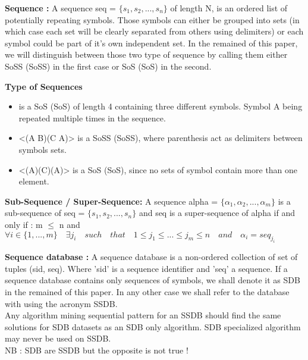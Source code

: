 \documentclass{eplmastersthesis}
\begin{document}
\begin{definition}{\bfseries Sequence :}
A sequence seq = $\{s_1, s_2, ..., s_n\}$ of length N, is an ordered list of potentially repeating symbols. Those symbols can either be grouped into sets (in which case each set will be clearly separated from others using delimiters) or each symbol could be part of it's own independent set. In the remained of this paper, we will distinguish between those two type of sequence by calling them either \acrlong{SoSS} (\acrshort{SoSS}) in the first case or \acrlong{SoS} (\acrshort{SoS}) in the second.
\end{definition}

\begin{example}{\bfseries Type of Sequences}
\begin{itemize}
\item  <A B C A> is a \acrlong{SoS} (\acrshort{SoS}) of length 4 containing three different symbols. Symbol A being repeated multiple times in the sequence.
\item <(A B)(C A)> is a \acrlong{SoSS} (\acrshort{SoSS}), where parenthesis act as delimiters between symbols sets.
\item <(A)(C)(A)> is a \acrlong{SoS} (\acrshort{SoS}), since no sets of symbol contain more than one element.
\end{itemize}
\end{example}

\begin{definition}{\bfseries Sub-Sequence / Super-Sequence:}
A sequence alpha = $\{\alpha_1, \alpha_2, ..., \alpha_m\}$ is a sub-sequence of seq = $\{s_1, s_2, ..., s_n\}$ and seq is a super-sequence of alpha if and only if : m $\leq$ n and $\forall i \in \{1, ..., m\} \quad \exists j_i \quad such \quad that \quad 1 \leq j_1 \leq ... \leq j_m \leq n \quad and \quad \alpha_i = seq_{j_i}$
\end{definition}

\begin{definition}{\bfseries Sequence database :}
A sequence database is a non-ordered collection of set of tuples (sid, seq). Where 'sid' is a sequence identifier and 'seq' a sequence. If a sequence database contains only sequences of symbols, we shall denote it as SDB in the remained of this paper. In any other case we shall refer to the database with using the acronym SSDB. \\
Any algorithm mining sequential pattern for an SSDB should find the same solutions for SDB datasets as an SDB only algorithm. SDB specialized algorithm may never be used on SSDB. \\
NB : SDB are SSDB but the opposite is not true ! 
\end{definition}
\end{document}
